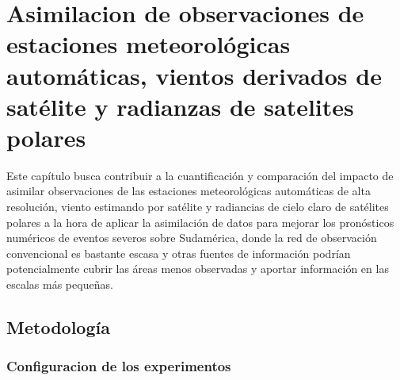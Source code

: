 \documentclass[12pt,oneside]{reedthesis}
\begin{document}
\hypertarget{asimilacion-de-observaciones-de-estaciones-meteoroluxf3gicas-automuxe1ticas-vientos-derivados-de-satuxe9lite-y-radianzas-de-satelites-polares}{%
\chapter{Asimilacion de observaciones de estaciones meteorológicas automáticas, vientos derivados de satélite y radianzas de satelites polares}\label{asimilacion-de-observaciones-de-estaciones-meteoroluxf3gicas-automuxe1ticas-vientos-derivados-de-satuxe9lite-y-radianzas-de-satelites-polares}}

Este capítulo busca contribuir a la cuantificación y comparación del impacto de asimilar observaciones de las estaciones meteorológicas automáticas de alta resolución, viento estimando por satélite y radiancias de cielo claro de satélites polares a la hora de aplicar la asimilación de datos para mejorar los pronósticos numéricos de eventos severos sobre Sudamérica, donde la red de observación convencional es bastante escasa y otras fuentes de información podrían potencialmente cubrir las áreas menos observadas y aportar información en las escalas más pequeñas.

\hypertarget{metodologuxeda}{%
\section{Metodología}\label{metodologuxeda}}

\hypertarget{config}{%
\subsection{Configuracion de los experimentos}\label{config}}
\end{document}
